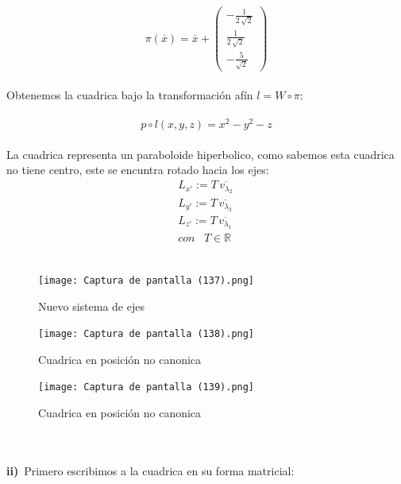 \documentclass[11pt,letterpaper]{article}
\newcommand{\R}{\mathbb{R}}
\begin{document}
    \,\\
    \begin{equation*}
        \pi(\overline{x})=\overline{x}+
        \begin{pmatrix}
                -\frac{1}{2\,\sqrt{2}}\\
                \frac{1}{2\,\sqrt{2}}\\
                -\frac{5}{\sqrt{2}}
                \end{pmatrix}
    \end{equation*}\,\\
    Obtenemos la cuadrica bajo la transformaci\'on af\'in $l=W\circ \pi $:\,\\
    \,\\
    \begin{equation*}
        p\circ l(x,y,z)=x^2-y^2-z
    \end{equation*}\,\\
    La cuadrica representa un paraboloide hiperbolico, como sabemos esta cuadrica no tiene centro, este se encuntra rotado
    hacia los ejes:\,\\
    \begin{align*}
        L_{x'}:=T\,\overline{v_{\lambda_2}}\,\\
        L_{y'}:=T\,\overline{v_{\lambda_3}}\,\\
        L_{z'}:=T\,\overline{v_{\lambda_1}}\,\\
        con\,\,\,\,\,T\in \R
    \end{align*}\,\\
    \begin{figure}[htb]
    \centering
    \texttt{[image: Captura de pantalla (137).png]}
    \caption{Nuevo sistema de ejes}
    \label{Cono rebanado}
     \end{figure}
       \begin{figure}[htb]
    \centering
    \texttt{[image: Captura de pantalla (138).png]}
    \caption{Cuadrica en posici\'on no canonica}
    \label{Cono rebanado}
     \end{figure}
       \begin{figure}[htb]
    \centering
    \texttt{[image: Captura de pantalla (139).png]}
    \caption{Cuadrica en posici\'on no canonica}
    \label{Cono rebanado}
    
     \end{figure}
    \newpage
    \,\\
    \newpage
    \,\\
     \textbf{ii)}\, Primero escribimos a la cuadrica en su forma matricial:\,\\
\end{document}

